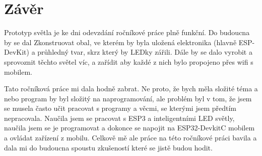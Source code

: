 \chapter{Závěr}
Prototyp světla je ke dni odevzdání ročníkové práce plně funkční. Do budoucna by se dal Zkonstruovat obal, ve kterém by byla uložená elektronika (hlavně ESP-DevKit) a průhledný tvar, skrz který by LEDky zářili. Dále by se dalo vyrobit a sprovoznit těchto světel víc, a zařídit aby každé z nich bylo propojeno přes wifi s mobilem.


Tato ročníková práce mi dala hodně zabrat. Ne proto, že bych měla složité téma a nebo program by byl složitý na naprogramování, ale problém byl v tom, že jsem se musela často učit pracovat s programy a věcmi, se kterými jsem předtím nepracovala. Naučila jsem se pracovat s ESP3 a inteligentními LED světly, naučila jsem se je programovat a dokonce se napojit na ESP32-DevkitC mobilem a ovládat zařízení z mobilu.
Celkově mě ale práce na této ročníkové práci bavila a dala mi do budoucna spoustu zkušeností které se jistě budou hodit. 

\newpage